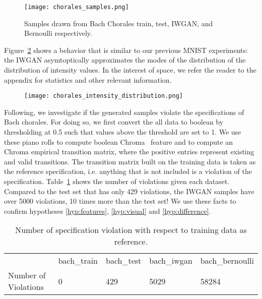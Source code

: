\begin{figure}[!h]
  \begin{center}
  \texttt{[image: chorales\_samples.png]}
  \caption{Samples drawn from Bach Chorales train, test,
IWGAN, and Bernoulli respectively.}
  \label{fig:chorales_samples}
  \end{center}
\end{figure}

Figure~\ref{fig:chorales_intensity_distribution} shows a behavior that is
similar to our previous MNIST experiments: the IWGAN asymtoptically approximates
the modes of the distribution of the distribution of intensity values. In the 
interest of space, we refer the reader to the appendix for statistics and other 
relevant information. 

\begin{figure}[!h]
  \texttt{[image: chorales\_intensity\_distribution.png]}
  \caption{}
  \label{fig:chorales_intensity_distribution}
\end{figure}

Following, we investigate if the generated samples violate the specifications of
Bach chorales. For doing so, we first convert the all data to boolean by 
thresholding at 0.5 such that values above the threshold are set to 1. We use
these piano rolls to compute boolean Chroma~\cite{peeters2004large} feature and
to compute an Chroma empirical transition matrix, where the positive
entries represent existing and valid transitions. The transition matrix built on 
the training data is taken as the reference specification, i.e. anything that is 
not included is a violation of the specification. Table~\ref{tbl:chroma_violations}
shows the number of violations given each dataset. Compared to the test set 
that has only 429 violations, the IWGAN samples have over 5000
violations, 10 times more than the test set! We use these facts to confirm
hypotheses \ref{hyp:features}, \ref{hyp:visual} and \ref{hyp:difference}.

\begin{table}[!h]
\centering
\begin{tabular}{lllll}
& \cellcolor[HTML]{C0C0C0}bach\_train & \cellcolor[HTML]{C0C0C0}bach\_test & \cellcolor[HTML]{C0C0C0}bach\_iwgan & \cellcolor[HTML]{C0C0C0}bach\_bernoulli \\ \cline{2-5} 
\multicolumn{1}{l|}{\cellcolor[HTML]{C0C0C0}Number of Violations} & 0                                   & 429                                & 5029                                & 58284                                  
\end{tabular}
\caption{Number of specification violation with respect to training data as
    reference.}
\label{tbl:chroma_violations}
\end{table}

